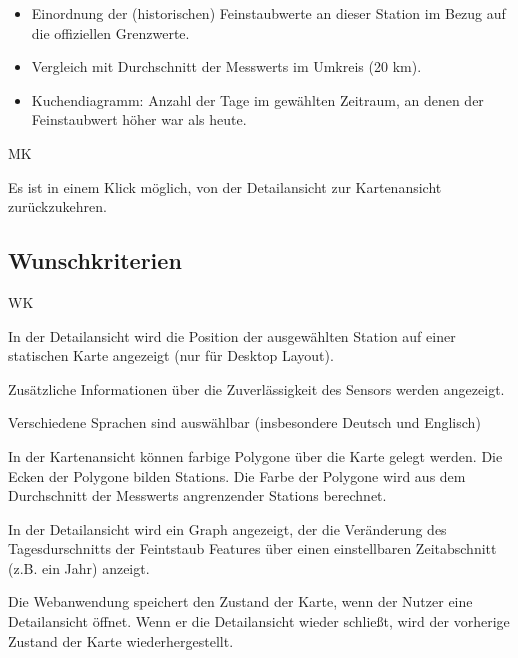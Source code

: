 \begin{itemize}
	\item Einordnung der (historischen) Feinstaubwerte an dieser \gls{Station} im Bezug auf die offiziellen Grenzwerte.
    \item Vergleich mit Durchschnitt der \glspl{Messwert} im Umkreis (20 km).
    \item \gls{Kuchendiagramm}: Anzahl der Tage im gewählten Zeitraum, an denen der Feinstaubwert höher war als heute.
\end{itemize}

\begin{Kriterien}{MK}	

	\item Es ist in einem Klick möglich, von der \gls{Detailansicht} zur \gls{Kartenansicht} zurückzukehren.

\end{Kriterien}

\newpage
\subsection{Wunschkriterien}
\setcounter{counter}{10}
\begin{Kriterien}{WK}

	\item In der \gls{Detailansicht} wird die Position der ausgewählten \gls{Station} auf einer statischen Karte angezeigt 
	(nur für Desktop Layout). 

	\item Zusätzliche Informationen über die Zuverlässigkeit des Sensors werden angezeigt.

	\item Verschiedene Sprachen sind auswählbar (insbesondere Deutsch und Englisch)
	
	\item In der \gls{Kartenansicht} können farbige Polygone über die Karte gelegt werden. Die Ecken der Polygone bilden 
	\glspl{Station}. Die Farbe der Polygone wird aus dem Durchschnitt der \glspl{Messwert} angrenzender \glspl{Station} berechnet.
	
	\item In der \gls{Detailansicht} wird ein \gls{Graph} angezeigt, der die Veränderung des Tagesdurschnitts der Feintstaub 
	\glspl{Feature} über einen einstellbaren Zeitabschnitt (z.B. ein Jahr) anzeigt.
	
	\item Die Webanwendung speichert den Zustand der Karte, wenn der Nutzer eine \gls{Detailansicht} öffnet. Wenn er die 
	\gls{Detailansicht} wieder schließt, wird der vorherige Zustand der Karte wiederhergestellt.

\end{Kriterien}

